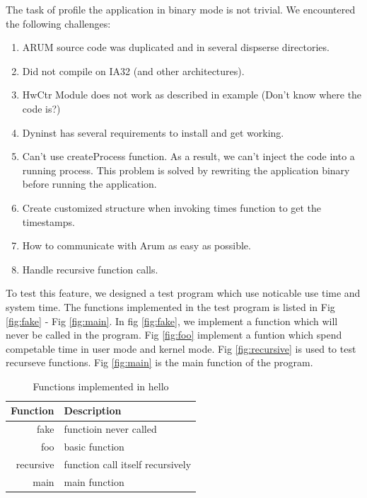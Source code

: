 \documentclass[11pt,letterpaper,oneside]{article}
\begin{document}
The task of profile the application in binary mode is not trivial. We encountered the following challenges:
\begin{enumerate}
\item ARUM source code was duplicated and in several dispserse directories.  
\item Did not compile on IA32 (and other architectures).
\item HwCtr Module does not work as described in example (Don't know where the code is?)
\item Dyninst has several requirements to install and get working.
\item Can't use createProcess function. As a result, we can't inject the code into a running process. This problem is solved by rewriting the application binary before running the application.
\item Create customized structure when invoking times function to get the timestamps.
\item How to communicate with Arum as easy as possible.
\item Handle recursive function calls.
\end{enumerate}

To test this feature, we designed a test program which use noticable use time and system time. The functions implemented in the test program is listed in Fig \ref{fig:fake} - Fig \ref{fig:main}. In fig \ref{fig:fake}, we implement a function which will never be called in the program. Fig \ref{fig:foo} implement a funtion which spend competable time in user mode and kernel mode. Fig \ref{fig:recursive} is used to test recurseve functions. Fig \ref{fig:main} is the main function of the program.

\begin{table}[th]
\caption{Functions implemented in hello}
\centering
\begin{tabular}{rl}
\hline
Function & Description \\
\hline
fake & functioin never called \\
foo  & basic function \\
recursive & function call itself recursively \\
main & main function \\
\hline
\end{tabular}
\label{table:mutatee}
\end{table}

\end{document}
